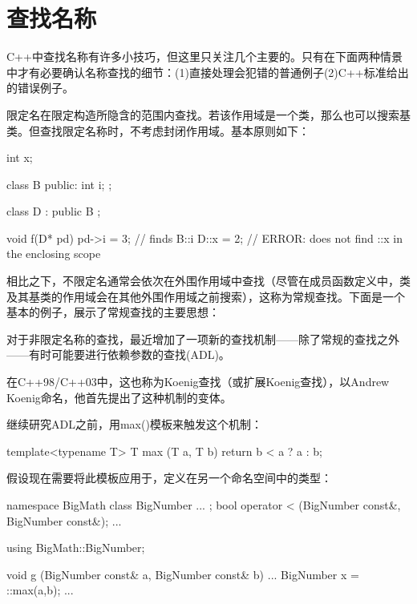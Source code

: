 \section{查找名称}

C++中查找名称有许多小技巧，但这里只关注几个主要的。只有在下面两种情景中才有必要确认名称查找的细节：(1)直接处理会犯错的普通例子(2)C++标准给出的错误例子。

限定名在限定构造所隐含的范围内查找。若该作用域是一个类，那么也可以搜索基类。但查找限定名称时，不考虑封闭作用域。基本原则如下：

\begin{cpp}
int x;

class B {
	public:
	int i;
};

class D : public B {
};

void f(D* pd)
{
	pd->i = 3; // finds B::i
	D::x = 2; // ERROR: does not find ::x in the enclosing scope
}
\end{cpp}

相比之下，不限定名通常会依次在外围作用域中查找（尽管在成员函数定义中，类及其基类的作用域会在其他外围作用域之前搜索），这称为常规查找。下面是一个基本的例子，展示了常规查找的主要思想：


对于非限定名称的查找，最近增加了一项新的查找机制——除了常规的查找之外——有时可能要进行依赖参数的查找(ADL)。

\begin{notice}
在C++98/C++03中，这也称为Koenig查找（或扩展Koenig查找），以Andrew Koenig命名，他首先提出了这种机制的变体。
\end{notice}

继续研究ADL之前，用max()模板来触发这个机制：

\begin{cpp}
template<typename T>
T max (T a, T b)
{
	return b < a ? a : b;
}
\end{cpp}

假设现在需要将此模板应用于，定义在另一个命名空间中的类型：

\begin{cpp}
namespace BigMath {
	class BigNumber {
		...
	};
	bool operator < (BigNumber const&, BigNumber const&);
	...
}

using BigMath::BigNumber;

void g (BigNumber const& a, BigNumber const& b)
{
	...
	BigNumber x = ::max(a,b);
	...
}
\end{cpp}

